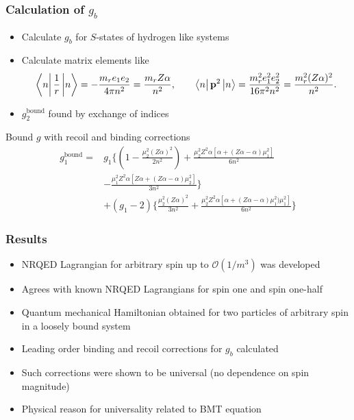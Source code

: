 \documentclass[11ppt]{beamer}
\newcommand{\beq}{\begin{equation*} }
\newcommand{\eeq}{\end{equation*} }
\begin{document}
\begin{frame}
\frametitle{Calculation of $g_b$}
\begin{itemize}
  \item	Calculate $g_b$ for $S$-states of hydrogen like systems
  \item Calculate matrix elements like
  	\footnotesize
  	\beq
		\matrixel{n}{\frac{1}{r}}{n} = - \frac{m_r e_1 e_2 }{4\pi n^2} = \frac{m_r Z\alpha}{n^2}, \hspace{2em}
		\matrixel{n}{\v{p}^2}{n} = \frac{ m_r^2  e_1^2 e_2^2}{16 \pi^2 n^2} = \frac{m_r^2  (Z\alpha)^2}{n^2}.
	\eeq
	
	\normalsize
	\item  $g_2^\text{bound}$ found by exchange of indices 
  \end{itemize}
  \footnotesize

  \begin{block}{Bound $g$ with recoil and binding corrections}
  \beq 
\begin{split}
g_1^\text{bound} =& g_1 \Bigg \{
			\left( 1 - \frac{ \mu_2^2 (Z\alpha)^2}{2n^2} \right )
			+ \frac{ 	\mu_2^2 Z^2 \alpha [ \alpha + (Z\alpha - \alpha)\mu_1^2 ] }{6n^2}
		\\&	- \frac{ \mu_1^2 Z^2 \alpha [Z\alpha + (Z\alpha - \alpha)\mu_2^2 ]}{3n^2} \Bigg \}
		\\& + (g_1 - 2) \Bigg \{
			\frac{ \mu_2^2 (Z\alpha)^2 }{3n^2}
			+ \frac{ \mu_2^2 Z^2 \alpha[ \alpha + ( Z\alpha - \alpha) \mu_1^2)\mu_1^2 ] }{6n^2} \Bigg \}
\end{split}
\eeq  \normalsize \end{block}

\end{frame}



\begin{frame}
\frametitle{Results}
\begin{itemize}
  \item  NRQED Lagrangian for arbitrary spin up to $\mathcal{O}(1/m^3)$ was developed
  \item  Agrees with known NRQED Lagrangians for spin one and spin one-half
  \item  Quantum mechanical Hamiltonian obtained for two particles of arbitrary spin in a loosely bound system
  \item  Leading order binding and recoil corrections for $g_b$ calculated
  \item  Such corrections were shown to be universal (no dependence on spin magnitude)
  \item  Physical reason for universality related to BMT equation
\end{itemize}
\end{frame}
\end{document}
